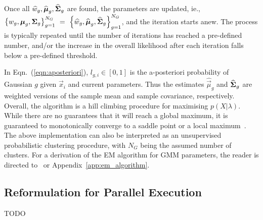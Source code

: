 \noindent
Once all $\widehat{w}_g, \widehat{{\boldsymbol{\mu}}}_g, \widehat{{\boldsymbol{\Sigma}}}_g$ are found, the parameters are updated,
ie., $\left\{ w_g, {\boldsymbol{\mu}}_g, {\boldsymbol{\Sigma}}_g \right\}_{g=1}^{N_G} ~ = ~ \left\{ \widehat{w}_g, \widehat{{\boldsymbol{\mu}}}_g, \widehat{{\boldsymbol{\Sigma}}}_g \right\}_{g=1}^{N_G}$,
and the iteration starts anew.
The process is typically repeated until the number of iterations has reached a pre-defined number,
and/or the increase in the overall likelihood after each iteration falls below a pre-defined threshold.

\noindent In Eqn.~(\ref{eqn:aposteriori}), $l_{g,i} \in [0,1]$ is the {a-posteriori} probability of Gaussian $g$ given $\Vec{x}_i$ and current parameters.
Thus the estimates $\widehat{\Vec{\mu}}_g$ and $\widehat{{\boldsymbol{\Sigma}}}_g$ are weighted versions of the
sample mean and sample covariance, respectively.
Overall, the algorithm is a hill climbing procedure for maximising $p(X | \lambda)$.
While there are no guarantees that it will reach a global maximum, it is guaranteed to monotonically converge to a saddle point or a local maximum~\cite{Dempster77,Duda01,Mitchell97}.
The above implementation can also be interpreted as an unsupervised probabilistic clustering procedure,
with $N_G$ being the assumed number of clusters.
For a derivation of the EM algorithm for GMM parameters, the reader is directed to~\cite{Bilmes98,Redner84} or Appendix~\ref{app:em_algorithm}.


\subsection{Reformulation for Parallel Execution}

TODO
